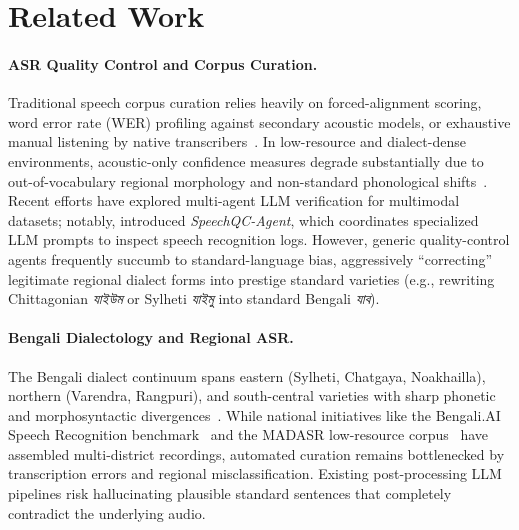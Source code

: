 \section{Related Work}
\label{sec:related_work}

\paragraph{ASR Quality Control and Corpus Curation.}
Traditional speech corpus curation relies heavily on forced-alignment scoring, word error rate (WER) profiling against secondary acoustic models, or exhaustive manual listening by native transcribers~\citep{panayotov2015librispeech,ardila2020common}. In low-resource and dialect-dense environments, acoustic-only confidence measures degrade substantially due to out-of-vocabulary regional morphology and non-standard phonological shifts~\citep{ahmed2021bengaliai,sarker2023madasr}. Recent efforts have explored multi-agent LLM verification for multimodal datasets; notably, \citet{speechqc2024} introduced \textit{SpeechQC-Agent}, which coordinates specialized LLM prompts to inspect speech recognition logs. However, generic quality-control agents frequently succumb to standard-language bias, aggressively ``correcting'' legitimate regional dialect forms into prestige standard varieties (e.g., rewriting Chittagonian \textit{যাইউম} or Sylheti \textit{যাইমু} into standard Bengali \textit{যাব}).

\paragraph{Bengali Dialectology and Regional ASR.}
The Bengali dialect continuum spans eastern (Sylheti, Chatgaya, Noakhailla), northern (Varendra, Rangpuri), and south-central varieties with sharp phonetic and morphosyntactic divergences~\citep{grierson1903linguistic,chatterji1926origin}. While national initiatives like the Bengali.AI Speech Recognition benchmark~\citep{ahmed2021bengaliai} and the MADASR low-resource corpus~\citep{sarker2023madasr} have assembled multi-district recordings, automated curation remains bottlenecked by transcription errors and regional misclassification. Existing post-processing LLM pipelines risk hallucinating plausible standard sentences that completely contradict the underlying audio.

